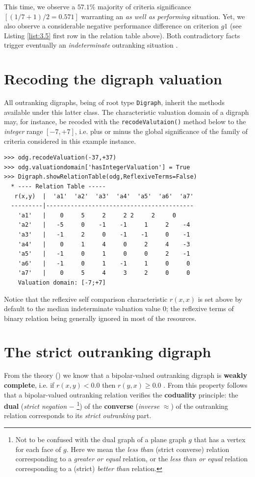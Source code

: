 This time, we observe a $57.1\%$ majority of criteria significance $[(1/7 + 1)/2 = 0.571]$ warranting an {\em as well as performing\/} situation. Yet, we also observe a considerable negative performance difference on criterion $g1$ (see Listing \ref{list:3.5} first row in the relation table above). Both contradictory facts trigger eventually an \emph{indeterminate} outranking situation \citep{BIS-2013}. 

\section{Recoding the digraph valuation}
\label{sec:3.4}

All outranking digraphs, being of root type {\tt Digraph}, inherit the methods available under this latter class. The characteristic valuation domain of a digraph may, for instance,  be recoded with the {\tt recodeValutaion()} method below to the {\em integer\/} range $[-7,+7]$, i.e. plus or minus the global significance of the family of criteria considered in this example instance.

\begin{lstlisting}[caption={Recoding the digraph valuation},label=list:3.7]
>>> odg.recodeValuation(-37,+37)
>>> odg.valuationdomain['hasIntegerValuation'] = True
>>> Digraph.showRelationTable(odg,ReflexiveTerms=False)
  * ---- Relation Table -----
   r(x,y)  |  'a1'  'a2'  'a3'  'a4'  'a5'  'a6'  'a7'	  
  ---------|------------------------------------------
    'a1'   |    0     5     2     2	2     2     0	 
    'a2'   |   -5     0    -1	 -1     1     2    -4	 
    'a3'   |   -1     2     0	 -1    -1     0    -1	 
    'a4'   |    0     1     4	  0     2     4    -3	 
    'a5'   |   -1     0     1	  0     0     2    -1	 
    'a6'   |   -1     0     1	 -1     1     0     0	 
    'a7'   |    0     5     4	  3     2     0     0	 
    Valuation domain: [-7;+7]
\end{lstlisting}

Notice that the reflexive self comparison characteristic $r(x,x)$ is set above by default to the median indeterminate valuation value $0$; the reflexive terms of binary relation being generally ignored in most of the  resources. 

\section{The strict outranking digraph}
\label{sec:3.5}

From the theory (\citet{BIS-2013, ADT-L7}) we know that a bipolar-valued outranking digraph is {\bf weakly complete}, i.e. if $r(x,y) < 0.0$ then $r(y,x) \geq 0.0$ . From this property follows that a bipolar-valued outranking relation verifies the {\bf coduality} principle: the {\bf dual} ({\em strict negation\/} $-$ \footnote{Not to be confused with the dual graph of a plane graph $g$ that has a vertex for each face of $g$. Here we mean the \emph{less than} (strict converse) relation corresponding to a \emph{greater or equal} relation, or the \emph{less than or equal} relation corresponding to a (strict) \emph{better than} relation.}) of the {\bf converse} ({\em inverse\/} $\approx$) of the outranking relation corresponds to its {\em strict outranking\/} part.

